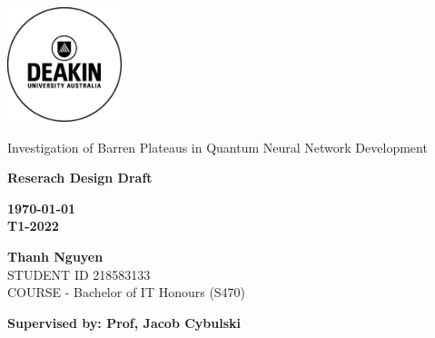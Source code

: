 \thispagestyle{empty}
\begin{titlepage}
    \includegraphics[width=0.25\textwidth]{src/CoverPage/Deakin_Logo.jpeg}
        \begin{center}
        \vspace*{4cm}
        {\LARGE Investigation of Barren Plateaus in Quantum Neural Network Development}
        \vspace{3cm}
            \begin{large}   
    
        
            \bf Reserach Design Draft
            \vspace{1cm}
        
            \bf \today \\
            T1-2022        
        
            \vspace{3cm}
            \textbf{Thanh Nguyen}\\
            STUDENT ID 218583133 \\
            COURSE - Bachelor of IT Honours (S470)
            \vfill

            \bf \normalsize Supervised by: Prof, Jacob Cybulski\\
       
        \end{large}  
   \end{center}
\end{titlepage}
